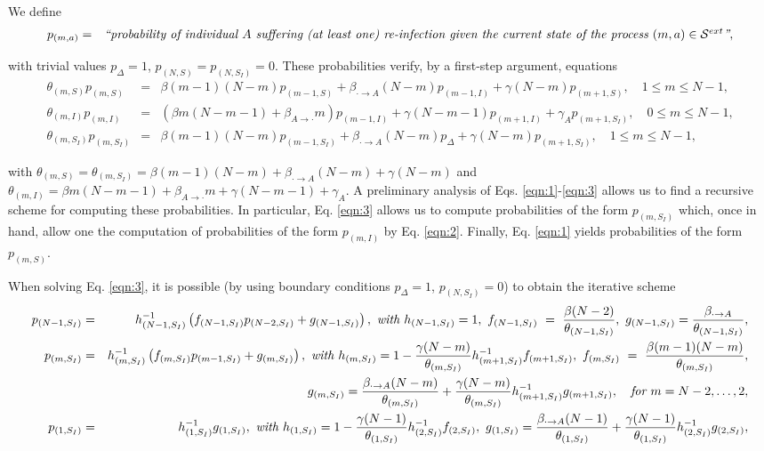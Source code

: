 \documentclass[10pt,A4paper]{article}
\begin{document}
\par We define
\begin{eqnarray*}
 p_{(m,a)} &=& \hbox{\it ``probability of individual $A$ suffering (at least one) re-infection given the current state of the process $(m,a)\in{\cal S}^{ext}$''},
\end{eqnarray*}
\par\noindent with trivial values $p_{\Delta}=1$, $p_{(N,S)}=p_{(N,S_I)}=0$. These probabilities verify, by a first-step argument, equations
\begin{eqnarray}
 \theta_{(m,S)}p_{(m,S)} &=& \beta(m-1)(N-m)p_{(m-1,S)}+\beta_{\cdot\rightarrow A}(N-m)p_{(m-1,I)}+\gamma(N-m)p_{(m+1,S)},\quad 1\leq m\leq N-1,\label{eqn:1}\\
 \theta_{(m,I)}p_{(m,I)} &=& \left(\beta m(N-m-1)+\beta_{A\rightarrow\cdot}m\right)p_{(m-1,I)}+\gamma (N-m-1)p_{(m+1,I)}+\gamma_Ap_{(m+1,S_I)},\quad 0\leq m\leq N-1,\label{eqn:2}\\
 \theta_{(m,S_I)}p_{(m,S_I)} &=& \beta(m-1)(N-m)p_{(m-1,S_I)}+\beta_{\cdot\rightarrow A}(N-m)p_{\Delta}+\gamma(N-m)p_{(m+1,S_I)},\quad 1\leq m\leq N-1,\label{eqn:3}
\end{eqnarray}
\par\noindent with $\theta_{(m,S)}=\theta_{(m,S_I)}=\beta(m-1)(N-m)+\beta_{\cdot\rightarrow A}(N-m)+\gamma(N-m)$ and $\theta_{(m,I)}=\beta m(N-m-1)+\beta_{A\rightarrow\cdot}m+\gamma(N-m-1)+\gamma_A$. A preliminary analysis of Eqs. \eqref{eqn:1}-\eqref{eqn:3} allows us to find a recursive scheme for
computing these probabilities. In particular, Eq. \eqref{eqn:3} allows us to compute probabilities of the form $p_{(m,S_I)}$ which,
once in hand, allow one the computation of probabilities of the form $p_{(m,I)}$ by Eq. \eqref{eqn:2}. Finally, Eq. \eqref{eqn:1} yields probabilities
of the form $p_{(m,S)}$.

\par When solving Eq. \eqref{eqn:3}, it is possible (by using boundary conditions $p_{\Delta}=1$, $p_{(N,S_I)}=0$) to obtain the iterative
scheme
\begin{eqnarray*}
 p_{(N-1,S_I)} &=& h_{(N-1,S_I)}^{-1}\left(f_{(N-1,S_I)}p_{(N-2,S_I)}+g_{(N-1,S_I)}\right),\ \hbox{\it with } h_{(N-1,S_I)}=1,\ f_{(N-1,S_I)} ~=~ \frac{\beta(N-2)}{\theta_{(N-1,S_I)}},\ g_{(N-1,S_I)}=\frac{\beta_{\cdot\rightarrow A}}{\theta_{(N-1,S_I)}},\\
 p_{(m,S_I)} &=& h_{(m,S_I)}^{-1}\left(f_{(m,S_I)}p_{(m-1,S_I)}+g_{(m,S_I)}\right),\ \hbox{\it with } h_{(m,S_I)}=1-\frac{\gamma(N-m)}{\theta_{(m,S_I)}}h_{(m+1,S_I)}^{-1}f_{(m+1,S_I)},\ f_{(m,S_I)} ~=~ \frac{\beta(m-1)(N-m)}{\theta_{(m,S_I)}},\\
&& g_{(m,S_I)}=\frac{\beta_{\cdot\rightarrow A}(N-m)}{\theta_{{(m,S_I)}}}+\frac{\gamma(N-m)}{\theta_{{(m,S_I)}}}h_{(m+1,S_I)}^{-1}g_{(m+1,S_I)}, \quad \hbox{\it for } m=N-2,\dots,2,\\
 p_{(1,S_I)} &=& h_{(1,S_I)}^{-1}g_{(1,S_I)},\ \hbox{\it with } h_{(1,S_I)}=1-\frac{\gamma(N-1)}{\theta_{(1,S_I)}}h_{(2,S_I)}^{-1}f_{(2,S_I)},\ g_{(1,S_I)}=\frac{\beta_{\cdot\rightarrow A} (N-1)}{\theta_{(1,S_I)}}+\frac{\gamma(N-1)}{\theta_{(1,S_I)}}h_{(2,S_I)}^{-1}g_{(2,S_I)},
\end{eqnarray*}
\end{document}
